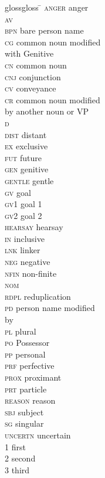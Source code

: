\documentclass[output=paper
,modfonts
,nonflat]{langsci/langscibook}
\begin{document}
\begin{multicols}{2}
	\begin{tabbing}
		glossgloss \= \kill
		\textsc{anger} \> anger\\
		\textsc{av} \> \\
		\textsc{bpn} \> bare person name\\
		\textsc{cg} \> common noun modified\\ \> with Genitive \\
		\textsc{cn} \> common noun\\
		\textsc{cnj} \> conjunction\\
		\textsc{cv} \> conveyance \\
		\textsc{cr} \> common noun modified\\ \>by another noun or VP\\
		\textsc{d} \> \\
		\textsc{dist} \> distant\\
		\textsc{ex} \> exclusive\\
		\textsc{fut} \> future\\
		\textsc{gen} \> genitive\\
		\textsc{gentle} \> gentle\\
		\textsc{gv} \> goal \\
		\textsc{gv1} \> goal  1\\
		\textsc{gv2} \> goal  2\\
		\textsc{hearsay} \> hearsay\\
		\textsc{in} \> inclusive\\
		\textsc{lnk} \> linker\\
		\textsc{neg} \> negative\\
		\textsc{nfin} \> non-finite\\
		\textsc{nom} \> \\
		\textsc{rdpl} \> reduplication\\
		\textsc{pd} \> person name modified\\ \> by \\
		\textsc{pl} \> plural\\
		\textsc{po} \> Possessor\\
		\textsc{pp} \> personal \\
		\textsc{prf} \> perfective\\
		\textsc{prox} \> proximant\\
		\textsc{prt} \> particle\\
		\textsc{reason} \> reason\\
		\textsc{sbj} \> subject\\
		\textsc{sg} \> singular\\
		\textsc{uncertn} \> uncertain\\
		1 \> first\\
		2 \> second\\
		3 \> third
	\end{tabbing}
\end{multicols}

\sloppy
\printbibliography[heading=subbibliography,notkeyword=this]
\end{document}
